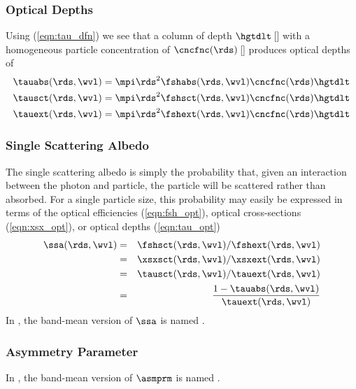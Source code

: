 \documentclass[12pt]{article}
\begin{document}
\subsubsection[Optical Depths]{Optical Depths}\label{sxn:tau_opt}
Using (\ref{eqn:tau_dfn}) we see that a column of depth
$\hgtdlt$\,[\m] with a homogeneous particle concentration of
$\cncfnc(\rds)$\,[\xmC] produces optical depths of
\begin{subequations}
\label{eqn:tau_opt}
\begin{align}
\label{eqn:tau_opt_abs}
\tauabs(\rds,\wvl) & = \mpi \rds^{2} \fshabs(\rds,\wvl)
\cncfnc(\rds) \hgtdlt \\
\label{eqn:tau_opt_sct}
\tausct(\rds,\wvl) & = \mpi \rds^{2} \fshsct(\rds,\wvl)
\cncfnc(\rds) \hgtdlt \\
\label{eqn:tau_opt_ext}
\tauext(\rds,\wvl) & = \mpi \rds^{2} \fshext(\rds,\wvl)
\cncfnc(\rds) \hgtdlt
\end{align}
\end{subequations} 

\subsubsection[Single Scattering Albedo]{Single Scattering Albedo}\label{sxn:ssa_opt}
The single scattering albedo is simply the probability that, given an
interaction between the photon and particle, the particle will be
scattered rather than absorbed.
For a single particle size, this probability may easily be expressed
in terms of the optical efficiencies (\ref{eqn:fsh_opt}), 
optical cross-sections (\ref{eqn:xsx_opt}), or
optical depths (\ref{eqn:tau_opt})
\begin{eqnarray}
\ssa(\rds,\wvl) & = & \fshsct(\rds,\wvl) / \fshext(\rds,\wvl)
\nonumber \\
& = & \xsxsct(\rds,\wvl) / \xsxext(\rds,\wvl) \nonumber \\
& = & \tausct(\rds,\wvl) / \tauext(\rds,\wvl) \nonumber \\
& = & \frac{ 1 - \tauabs(\rds,\wvl)}{\tauext(\rds,\wvl) }
\label{eqn:ssa_opt}
\end{eqnarray}
In , the band-mean version of $\ssa$ is named
.  

\subsubsection[Asymmetry Parameter]{Asymmetry Parameter}\label{sxn:asm_prm_opt}
In , the band-mean version of $\asmprm$ is named
.  
\end{document}
